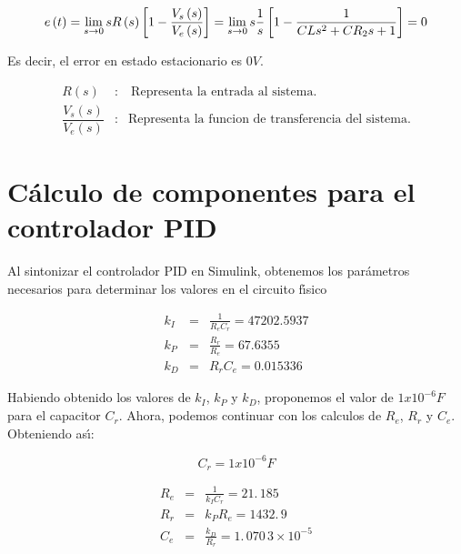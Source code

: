 \documentclass[letterpaper,11pt]{article}
\begin{document}
\begin{equation*}
e\left( t\right) =\lim_{s\rightarrow 0}sR\left( s\right) \left[ 1-\dfrac{%
V_{s}\left( s\right) }{V_{e}\left( s\right) }\right] =\lim_{s\rightarrow 0}s%
\frac{1}{s}\left[ 1-\frac{1}{CLs^{2}+CR_{2}s+1}\right] =0
\end{equation*}

Es decir, el error en estado estacionario es $0V$.

\begin{eqnarray*}
R(s) &:&\ \text{Representa la entrada al sistema.} \\
\dfrac{V_{s}\left( s\right) }{V_{e}\left( s\right) } &:&\text{Representa la
funcion de transferencia del sistema.}
\end{eqnarray*}

\section{C\'{a}lculo de componentes para el controlador PID}

Al sintonizar el controlador PID en Simulink, obtenemos los par\'{a}metros
necesarios para determinar los valores en el circuito f\'{\i}sico

\begin{eqnarray*}
k_{I} &=&\frac{1}{R_{e}C_{r}}=47202.5937 \\
k_{P} &=&\frac{R_{r}}{R_{e}}=67.6355 \\
k_{D} &=&R_{r}C_{e}=0.015336
\end{eqnarray*}

\bigskip Habiendo obtenido los valores de $k_{I}$, $k_{P}$ y $k_{D}$,
proponemos el valor de $1x10^{-6}F$ para el capacitor $C_{r}$. Ahora,
podemos continuar con los calculos de $R_{e}$, $R_{r}$ y $C_{e}$. Obteniendo
as\'{\i}:

\begin{equation*}
C_{r}=1x10^{-6}F
\end{equation*}

\begin{eqnarray*}
R_{e} &=&\frac{1}{k_{I}C_{r}}=21.\,\allowbreak 185 \\
R_{r} &=&k_{P}R_{e}=1432.\,\allowbreak 9 \\
C_{e} &=&\frac{k_{D}}{R_{r}}=1.\,\allowbreak 070\,3\times 10^{-5}
\end{eqnarray*}
\end{document}
